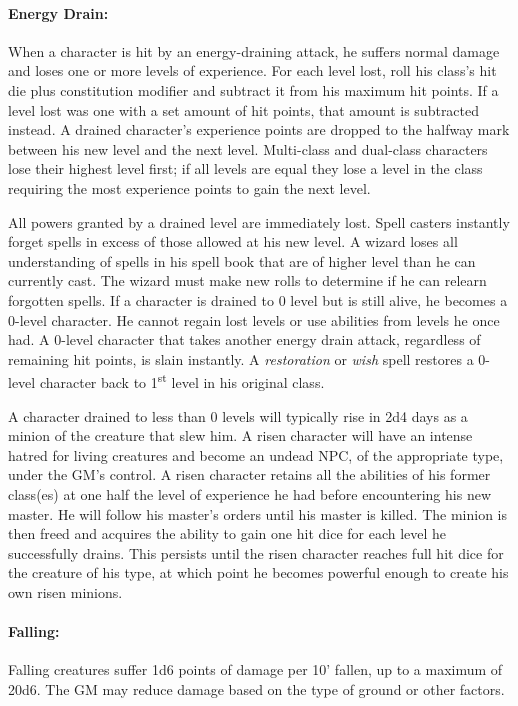 \begin{multicols}{2}
\paragraph{Energy Drain:} When a character is hit by an energy-draining attack, he suffers normal damage and loses one or more levels of experience.  For each level lost, roll his class's hit die plus constitution modifier and subtract it from his maximum hit points.  If a level lost was one with a set amount of hit points, that amount is subtracted instead.  A drained character's experience points are dropped to the halfway mark between his new level and the next level.  Multi-class and dual-class characters lose their highest level first; if all levels are equal they lose a level in the class requiring the most experience points to gain the next level.

All powers granted by a drained level are immediately lost.  Spell casters instantly forget spells in excess of those allowed at his new level.  A wizard loses all understanding of spells in his spell book that are of higher level than he can currently cast.  The wizard must make new rolls to determine if he can relearn forgotten spells.  If a character is drained to 0 level but is still alive, he becomes a 0-level character.  He cannot regain lost levels or use abilities from levels he once had.  A 0-level character that takes another energy drain attack, regardless of remaining hit points, is slain instantly.  A \textit{restoration} or \textit{wish} spell restores a 0-level character back to 1\textsuperscript{st} level in his original class.

A character drained to less than 0 levels will typically rise in 2d4 days as a minion of the creature that slew him.  A risen character will have an intense hatred for living creatures and become an undead NPC, of the appropriate type, under the GM's control.  A risen character retains all the abilities of his former class(es) at one half the level of experience he had before encountering his new master.  He will follow his master's orders until his master is killed.  The minion is then freed and acquires the ability to gain one hit dice for each level he successfully drains.  This persists until the risen character reaches full hit dice for the creature of his type, at which point he becomes powerful enough to create his own risen minions.

\paragraph{Falling:} Falling creatures suffer 1d6 points of damage per 10' fallen, up to a maximum of 20d6.  The GM may reduce damage based on the type of ground or other factors.


\end{multicols}
